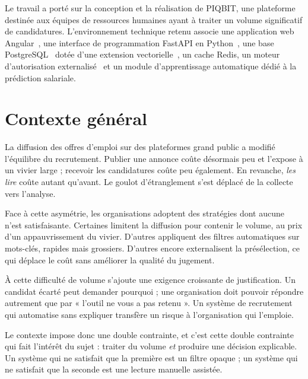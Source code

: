 
Le travail a porté sur la conception et la réalisation de PIQBIT, une
plateforme destinée aux équipes de ressources humaines ayant à traiter un
volume significatif de candidatures. L'environnement technique retenu associe
une application web Angular~\cite{angular}, une interface de programmation
FastAPI en Python~\cite{fastapi}, une base PostgreSQL~\cite{postgresql} dotée
d'une extension vectorielle~\cite{pgvector}, un cache Redis, un moteur
d'autorisation externalisé~\cite{casbin} et un module d'apprentissage
automatique dédié à la prédiction salariale.

\section{Contexte général}
\label{sec:general_context}

La diffusion des offres d'emploi sur des plateformes grand public a modifié
l'équilibre du recrutement. Publier une annonce coûte désormais peu et
l'expose à un vivier large ; recevoir les candidatures coûte peu également.
En revanche, \emph{les lire} coûte autant qu'avant. Le goulot d'étranglement
s'est déplacé de la collecte vers l'analyse.

Face à cette asymétrie, les organisations adoptent des stratégies dont aucune
n'est satisfaisante. Certaines limitent la diffusion pour contenir le volume,
au prix d'un appauvrissement du vivier. D'autres appliquent des filtres
automatiques sur mots-clés, rapides mais grossiers. D'autres encore
externalisent la présélection, ce qui déplace le coût sans améliorer la
qualité du jugement.

À cette difficulté de volume s'ajoute une exigence croissante de
justification. Un candidat écarté peut demander pourquoi ; une organisation
doit pouvoir répondre autrement que par « l'outil ne vous a pas retenu ». Un
système de recrutement qui automatise sans expliquer transfère un risque à
l'organisation qui l'emploie.

Le contexte impose donc une double contrainte, et c'est cette double contrainte
qui fait l'intérêt du sujet : traiter du volume \emph{et} produire une
décision explicable. Un système qui ne satisfait que la première est un filtre
opaque ; un système qui ne satisfait que la seconde est une lecture manuelle
assistée.

